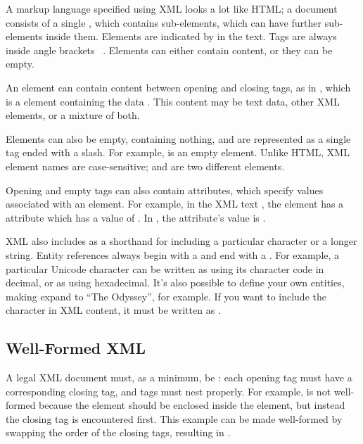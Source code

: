\documentclass{howto}
\newcommand{\element}[1]{\code{#1}}
\newcommand{\attribute}[1]{\code{#1}}
\begin{document}
A markup language specified using XML looks a lot like HTML; a
document consists of a single , which contains
sub-elements, which can have further sub-elements inside them.
Elements are indicated by  in the text.  Tags are always
inside angle brackets \code{<}~\code{>}.  Elements can either contain
content, or they can be empty.

An element can contain content between opening and closing
tags, as in , which is a \element{name}
element containing the data . This content may be text
data, other XML elements, or a mixture of both. 

Elements can also be empty, containing nothing, and are represented as
a single tag ended with a slash.  For example,  is an
empty \element{stop} element.  Unlike HTML, XML element names are
case-sensitive; \element{stop} and \element{Stop} are two different
elements.

Opening and empty tags can also contain attributes, which specify
values associated with an element.  For example, in the XML text
, the \element{name} element
has a \attribute{lang} attribute which has a value of .
In , 
the attribute's value is .

XML also includes  as a shorthand for including a
particular character or a longer string.  Entity references always
begin with a \samp{\&} and end with a \samp{;}.  For example, a
particular Unicode character can be written as  using
its character code in decimal, or as  using
hexadecimal.  It's also possible to define your own entities, making
 expand to ``The Odyssey'', for example.  If you want to
include the \samp{\&} character in XML content, it must be written as
.


\subsection{Well-Formed XML}

A legal XML document must, as a minimum, be : each
opening tag must have a corresponding closing tag, and tags must nest
properly.  For example,  is not well-formed
because the \element{i} element should be enclosed inside the
\element{b} element, but instead the closing  tag is
encountered first.  This example can be made well-formed by swapping
the order of the closing tags, resulting in .
\end{document}

